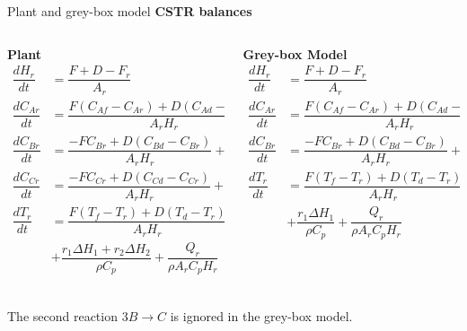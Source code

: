 \documentclass[xcolor=dvipsnames, 8pt]{beamer} %
\begin{document}
\begin{frame}{Plant and grey-box model}
	\textbf{CSTR balances}
	\vspace{0.2in}
	\begin{columns}
		\begin{column}{0.45\textwidth}
			\textbf{Plant} \\
			\begin{align*}				
			\dfrac{dH_r}{dt} &= \dfrac{F + D -F_r}{A_r}\\
			\dfrac{dC_{Ar}}{dt} &= \dfrac{F(C_{Af} -C_{Ar}) +
								   D(C_{Ad} -C_{Ar})}{A_rH_r} - r_1 \\
			\dfrac{dC_{Br}}{dt} &= \dfrac{-FC_{Br} + 
									D(C_{Bd} -C_{Br})}{A_rH_r} + r_1 -3r_2\\
			\dfrac{dC_{Cr}}{dt} &= \dfrac{-FC_{Cr} + 
			D(C_{Cd} -C_{Cr})}{A_rH_r} + r_2\\
			\dfrac{dT_r}{dt} &= \dfrac{F(T_f - T_r) + D(T_d -T_r)}{A_rH_r} \\
						& + \dfrac{r_1\Delta H_1 + r_2\Delta H_2}{\rho C_p} + 
							\dfrac{Q_r}{\rho A_r C_p H_r}\\
			\end{align*}
		\end{column}
		\begin{column}{0.45\textwidth}
			\textbf{Grey-box Model}
			\begin{align*}
			\dfrac{dH_r}{dt} &= \dfrac{F + D -F_r}{A_r}\\
			\dfrac{dC_{Ar}}{dt} &= \dfrac{F(C_{Af} -C_{Ar}) + 
								   D(C_{Ad} -C_{Ar})}{A_rH_r} - r_1 \\
			\dfrac{dC_{Br}}{dt} &= \dfrac{-FC_{Br} + 
									D(C_{Bd} -C_{Br})}{A_rH_r} + r_1\\
			\dfrac{dT_r}{dt} &= \dfrac{F(T_f - T_r) + D(T_d -T_r)}{A_rH_r} \\ 
							& + \dfrac{r_1\Delta H_1}{\rho C_p} + 
								\dfrac{Q_r}{\rho A_r C_p H_r}\\
			\end{align*}
		\end{column}
	\end{columns}
The second reaction $3B \rightarrow C$ is ignored in the grey-box model.
\end{frame}
\end{document}

